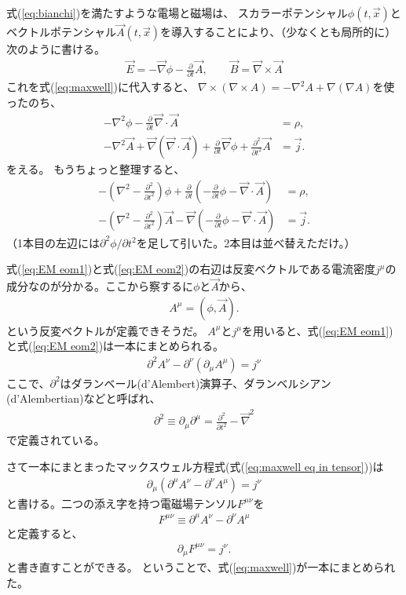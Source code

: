 \documentclass[10pt,a4paper]{jarticle}
\begin{document}
式(\ref{eq:bianchi})を満たすような電場と磁場は、
スカラーポテンシャル$\phi(t,\vec x)$とベクトルポテンシャル$\vec A(t,\vec x)$を導入することにより、（少なくとも局所的に）次のように書ける。
\begin{align}
\vec E = -\vec\nabla \phi - \frac{\partial}{\partial t}\vec A, \qquad
\vec B = \vec\nabla \times \vec A
\label{eq:E and B from A}
\end{align}
これを式(\ref{eq:maxwell})に代入すると、
$\nabla \times (\nabla \times A) = -\nabla^2 A + \nabla (\nabla A) $を使ったのち、
\begin{align}
-\nabla^2 \phi - \frac{\partial}{\partial t} \vec \nabla \cdot \vec A &= \rho, \\
-\nabla^2 \vec A + \vec \nabla (\vec \nabla \cdot \vec A) + \frac{\partial}{\partial t}\vec\nabla\phi + \frac{\partial^2}{\partial t^2} \vec A &= \vec j.
\end{align}
をえる。
もうちょっと整理すると、
\begin{align}
-\left(\nabla^2 - \frac{\partial^2}{\partial t^2}\right)\phi + \frac{\partial}{\partial t} \left( -\frac{\partial}{\partial t}\phi - \vec \nabla \cdot \vec A \right) &= \rho, \label{eq:EM eom1}\\
- \left( \nabla^2 - \frac{\partial^2}{\partial t^2}\right) \vec A
-\vec\nabla \left( -\frac{\partial}{\partial t}\phi - \vec \nabla \cdot \vec A \right)
 &= \vec j. \label{eq:EM eom2}
\end{align}
（1本目の左辺には$\partial^2\phi/\partial t^2$を足して引いた。2本目は並べ替えただけ。）

式(\ref{eq:EM eom1})と式(\ref{eq:EM eom2})の右辺は反変ベクトルである電流密度$j^\mu$の成分なのが分かる。ここから察するに$\phi$と$\vec A$から、
\begin{align}
A^\mu = (\phi, \vec A).
\end{align}
という反変ベクトルが定義できそうだ。
$A^\mu$と$j^\mu$を用いると、式(\ref{eq:EM eom1})と式(\ref{eq:EM eom2})は一本にまとめられる。
\begin{align}
\partial^2 A^\nu - \partial^\nu (\partial_\mu A^\mu) = j^\nu \label{eq:maxwell eq in tensor}
\end{align}
ここで、$\partial^2$はダランベール(d'Alembert)演算子、ダランベルシアン(d'Alembertian)などと呼ばれ、
\begin{align}
\partial^2 \equiv \partial_\mu \partial^\mu = \frac{\partial^2}{\partial t^2} - \vec\nabla^2
\end{align}
で定義されている。

さて一本にまとまったマックスウェル方程式(式(\ref{eq:maxwell eq in tensor}))は
\begin{align}
\partial_\mu ( \partial^\mu A^\nu - \partial^\nu A^\mu  ) = j^\nu
\end{align}
と書ける。二つの添え字を持つ電磁場テンソル$F^{\mu\nu}$を
\begin{align}
F^{\mu\nu} \equiv \partial^\mu A^\nu - \partial^\nu A^\mu
\end{align}
と定義すると、
\begin{align}
\partial_\mu F^{\mu\nu} = j^\nu.
\end{align}
と書き直すことができる。
ということで、式(\ref{eq:maxwell})が一本にまとめられた。
\end{document}
